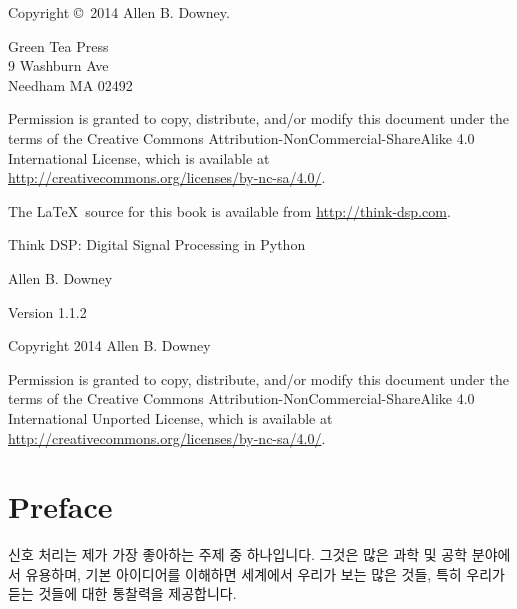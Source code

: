 \documentclass[12pt]{book} \usepackage[width=5.5in,height=8.5in, hmarginratio=3:2,vmarginratio=1:1]{geometry}
\newcommand{\thetitle}{Think DSP} \newcommand{\thesubtitle}{Digital Signal Processing in Python} \newcommand{\theversion}{1.1.2}
\begin{document}
\begin{latexonly}
\thispagestyle{empty} 

Copyright \copyright ~2014 Allen B. Downey. 

\vspace{0.2in} 

\begin{flushleft} Green Tea Press \\ 9 Washburn Ave \\ Needham MA 02492 \end{flushleft} 

Permission is granted to copy, distribute, and/or modify this document under the terms of the Creative Commons Attribution-NonCommercial-ShareAlike 4.0 International License, which is available at \url{http://creativecommons.org/licenses/by-nc-sa/4.0/}. 

The \LaTeX\ source for this book is available from \url{http://think-dsp.com}. 

\vspace{0.2in} 

\end{latexonly} 

\begin{htmlonly} 

{\Large \thetitle: \thesubtitle} 

{\large Allen B. Downey} 

Version \theversion

\vspace{0.25in} 

Copyright 2014 Allen B. Downey 

\vspace{0.25in} 

Permission is granted to copy, distribute, and/or modify this document under the terms of the Creative Commons Attribution-NonCommercial-ShareAlike 4.0 International Unported License, which is available at \url{http://creativecommons.org/licenses/by-nc-sa/4.0/}. 

\setcounter{chapter}{-1} 

\end{htmlonly} 

\fi

\chapter{Preface} \label{preface} 

신호 처리는 제가 가장 좋아하는 주제 중 하나입니다. 그것은 많은 과학 및 공학 분야에서 유용하며, 기본 아이디어를 이해하면 세계에서 우리가 보는 많은 것들, 특히 우리가 듣는 것들에 대한 통찰력을 제공합니다. 
\end{document}

